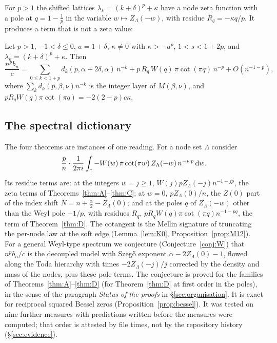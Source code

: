 For $p>1$ the shifted lattices $\lambda_k=(k+\delta)^p+\kappa$ have a node zeta function with a pole at $q=1-\frac1p$ in the
variable $w\mapsto Z_\Lambda(-w)$, with residue $R_q=-\kappa q/p$. It produces a term that is not a zeta value:

\begin{mainthm}\label{thm:D}
Let $p>1$, $-1<\delta\le0$, $a=1+\delta$, $\kappa\ne0$ with $\kappa>-a^p$, $1<s<1+2p$, and $\lambda_k=(k+\delta)^p+\kappa$. Then
\[
  \frac{n^pb_n}c=\sum_{0\le k<1+p}d_k(p,\alpha+2\delta,\alpha)\,n^{-k}+p\,R_q\,W(q)\,\pi\cot(\pi q)\,n^{-p}+O(n^{-1-p}),
\]
where $\sum_kd_k(p,\beta,\nu)n^{-k}$ is the integer layer of $M(\beta,\nu)$, and $pR_qW(q)\pi\cot(\pi q)=-2(2-p)c\kappa$.
\end{mainthm}

\subsection{The spectral dictionary}\label{sec:dictionary}
The four theorems are instances of one reading. For a node set $\Lambda$ consider
\begin{equation}\label{eq:dictionary}
  \frac pn\cdot\frac1{2\pi i}\int_{\uparrow}-W(w)\,\pi\cot(\pi w)\,Z_\Lambda(-w)\,n^{-wp}\,\mathrm{d} w .
\end{equation}
Its residue terms are: at the integers $w=j\ge1$, $W(j)pZ_\Lambda(-j)n^{-1-jp}$, the zeta terms of Theorems~\ref{thm:A}--\ref{thm:C}; at
$w=0$, $pZ_\Lambda(0)/n$, the $Z(0)$ part of the index shift $N=n+\frac\alpha2-Z_\Lambda(0)$; and at the poles $q$ of $Z_\Lambda(-w)$ other
than the Weyl pole $-1/p$, with residues $R_q$, $pR_qW(q)\pi\cot(\pi q)n^{-1-pq}$, the term of Theorem~\ref{thm:D}. The cotangent is the
Mellin signature of truncating the per-node law at the soft edge (Lemma~\ref{lem:K0}, Proposition~\ref{prop:M12}). For a general Weyl-type
spectrum we conjecture (Conjecture~\ref{conj:W}) that $n^pb_n/c$ is the decoupled model with Szeg\H{o} exponent $\alpha-2Z_\Lambda(0)-1$,
flowed along the Toda hierarchy with times $-2Z_\Lambda(-j)/j$ corrected by the density and mass of the nodes, plus these pole terms. The
conjecture is proved for the families of Theorems~\ref{thm:A}--\ref{thm:D} (for Theorem~\ref{thm:D} at first order in the poles), in the
sense of the paragraph \emph{Status of the proofs} in \S\ref{sec:organisation}. It is exact for reciprocal squared Bessel zeros
(Proposition~\ref{prop:bessel}). It was tested on nine further measures with predictions written before the measures were computed; that
order is attested by file times, not by the repository history (\S\ref{sec:evidence}).

